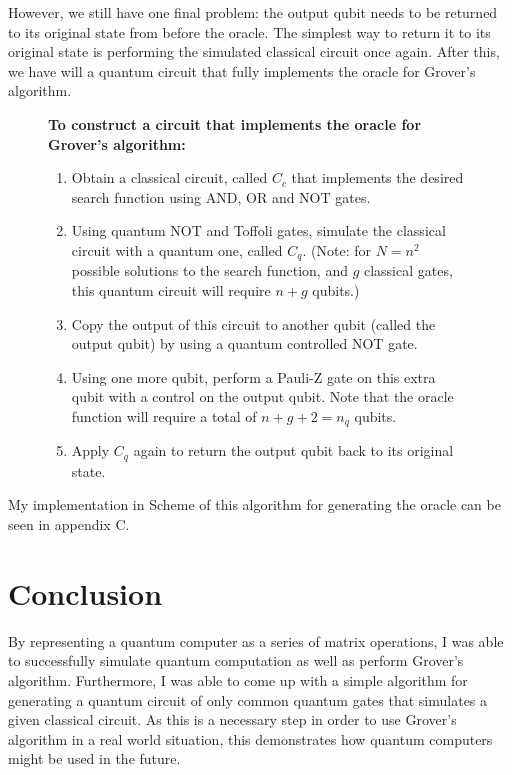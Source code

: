\documentclass[11pt]{article}
\begin{document}
However, we still have one final problem: the output qubit needs to be returned to its original state from before the oracle. The simplest way to return it to its original state is performing the simulated classical circuit once again. After this, we have will a quantum circuit that fully implements the oracle for Grover's algorithm.

\begin{figure}[H]
\begin{framed}
\textbf{To construct a circuit that implements the oracle for Grover's algorithm:}
\begin{enumerate}
\item Obtain a classical circuit, called $C_{c}$ that implements the desired search function using AND, OR and NOT gates.
\item Using quantum NOT and Toffoli gates, simulate the classical circuit with a quantum one, called $C_{q}$. (Note: for $N=n^{2}$ possible solutions to the search function, and $g$ classical gates, this quantum circuit will require $n+g$ qubits.)
\item Copy the output of this circuit to another qubit (called the output qubit) by using a quantum controlled NOT gate.
\item Using one more qubit, perform a Pauli-Z gate on this extra qubit with a control on the output qubit. Note that the oracle function will require a total of $n+g+2=n_{q}$ qubits.
\item Apply $C_{q}$ again to return the output qubit back to its original state.
\end{enumerate}
\end{framed}
\end{figure}

My implementation in Scheme of this algorithm for generating the oracle can be seen in appendix C.

\section{Conclusion}

By representing a quantum computer as a series of matrix operations, I was able to successfully simulate quantum computation as well as perform Grover's algorithm. Furthermore, I was able to come up with a simple algorithm for generating a quantum circuit of only common quantum gates that simulates a given classical circuit. As this is a necessary step in order to use Grover's algorithm in a real world situation, this demonstrates how quantum computers might be used in the future.
\end{document}
